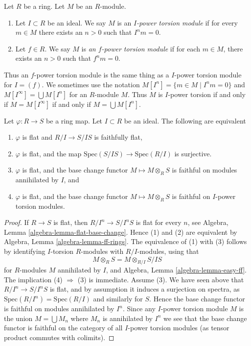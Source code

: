 \begin{definition}
\label{definition-f-power-torsion}
Let $R$ be a ring. Let $M$ be an $R$-module.
\begin{enumerate}
\item Let $I \subset R$ be an ideal. We say $M$ is an
{\it $I$-power torsion module} if for every $m \in M$ there exists an $n > 0$
such that $I^n m = 0$.
\item Let $f \in R$. We say $M$ is 
{\it an $f$-power torsion module} if for each 
$m \in M$, there exists an $n > 0$ such that $f^n m = 0$.
\end{enumerate}
\end{definition}

\noindent
Thus an $f$-power torsion module is the same thing as a $I$-power torsion
module for $I = (f)$. We sometimes use the notation
$M[I^n] = \{m \in M \mid I^nm = 0\}$ and $M[I^\infty] = \bigcup M[I^n]$
for an $R$-module $M$. Thus $M$ is $I$-power torsion if and only if
$M = M[I^\infty]$ if and only if $M = \bigcup M[I^n]$.

\begin{lemma}
\label{lemma-characterize-flatness-on-torsion}
Let $\varphi : R \to S$ be a ring map. Let $I \subset R$ be an ideal.
The following are equivalent
\begin{enumerate}
\item $\varphi$ is flat and $R/I \to S/IS$ is faithfully flat,
\item $\varphi$ is flat, and the map
$\text{Spec}(S/IS) \to \text{Spec}(R/I)$ is surjective.
\item $\varphi$ is flat, and the base change functor
$M \mapsto M \otimes_R S$ is faithful on modules annihilated by $I$, and
\item $\varphi$ is flat, and the base change functor
$M \mapsto M \otimes_R S$ is faithful on $I$-power torsion modules.
\end{enumerate}
\end{lemma}

\begin{proof}
If $R \to S$ is flat, then $R/I^n \to S/I^nS$ is flat for every $n$, see
Algebra, Lemma \ref{algebra-lemma-flat-base-change}.
Hence (1) and (2) are equivalent by
Algebra, Lemma \ref{algebra-lemma-ff-rings}.
The equivalence of (1) with (3) follows by identifying $I$-torsion
$R$-modules with $R/I$-modules, using that
$$
M \otimes_R S = M \otimes_{R/I} S/IS
$$ 
for $R$-modules $M$ annihilated by $I$, and
Algebra, Lemma \ref{algebra-lemma-easy-ff}.
The implication (4) $\Rightarrow$ (3) is immediate. Assume (3). We have
seen above that $R/I^n \to S/I^nS$ is flat, and by assumption it induces
a surjection on spectra, as $\text{Spec}(R/I^n) = \text{Spec}(R/I)$ and
similarly for $S$. Hence the base change functor is faithful on modules
annihilated by $I^n$. Since any $I$-power torsion module $M$ is the union
$M = \bigcup M_n$ where $M_n$ is annihilated by $I^n$ we see that the base
change functor is faithful on the category of all $I$-power torsion modules
(as tensor product commutes with colimits).
\end{proof}

